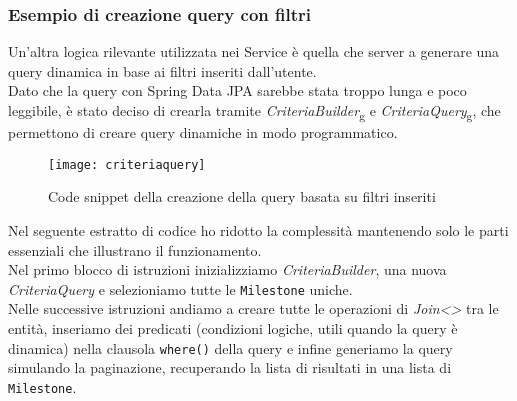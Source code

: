 \subsubsection{Esempio di creazione query con filtri}
Un'altra logica rilevante utilizzata nei Service è quella che server a generare una query dinamica in base ai filtri inseriti dall'utente.\\
Dato che la query con Spring Data JPA sarebbe stata troppo lunga e poco leggibile, è stato deciso di crearla tramite \textit{CriteriaBuilder}\textsubscript{g} e \textit{CriteriaQuery}\textsubscript{g}, che permettono di creare query dinamiche in modo programmatico.
\begin{figure}[H] 
    \centering 
    \texttt{[image: criteriaquery]} 
    \caption{Code snippet della creazione della query basata su filtri inseriti}
\end{figure}
\noindent Nel seguente estratto di codice ho ridotto la complessità mantenendo solo le parti essenziali che illustrano il funzionamento.\\
Nel primo blocco di istruzioni inizializziamo \textit{CriteriaBuilder}, una nuova \textit{CriteriaQuery} e selezioniamo tutte le \texttt{Milestone} uniche.\\
Nelle successive istruzioni andiamo a creare tutte le operazioni di \textit{Join<>} tra le entità, inseriamo dei predicati (condizioni logiche, utili quando la query è dinamica) nella clausola \texttt{where()} della query e infine generiamo la query simulando la paginazione, recuperando la lista di risultati in una lista di \texttt{Milestone}.

